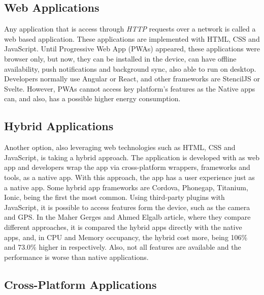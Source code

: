 \subsection{Web Applications}\label{subsec:web-applications}

Any application that is access through \textit{HTTP} requests over a network is called a web based application. These applications are implemented with HTML, CSS and JavaScript. Until Progressive Web App (PWAs) appeared, these applications were browser only, but now, they can be installed in the device, can have offline availability, push notifications and background sync, also able to run on desktop. Developers normally use Angular or React, and other frameworks are StencilJS or Svelte. However, PWAs cannot access key platform's features as the Native apps can, and also, has a possible higher energy consumption.\cite{Huber2021}

\subsection{Hybrid Applications}\label{subsec:hybrid-applications}

Another option, also leveraging web technologies such as HTML, CSS and JavaScript, is taking a hybrid approach. The application is developed with as web app and developers wrap the app via cross-platform wrappers, frameworks and tools, as a native app. With this approach, the app has a user experience just as a native app. Some hybrid app frameworks are Cordova, Phonegap, Titanium, Ionic, being the first the most common.
Using third-party plugins with JavaScript, it is possible to access features form the device, such as the camera and GPS\@. In the Maher Gerges and Ahmed Elgalb article\cite{Gerges2024}, where they compare different approaches, it is compared the hybrid apps directly with the native apps, and, in CPU and Memory occupancy, the hybrid cost more, being 106\% and 73.0\% higher in respectively. Also, not all features are available and the performance is worse than native applications.\cite{Gerges2024}

\subsection{Cross-Platform Applications}\label{subsec:cross-platform-apps}

